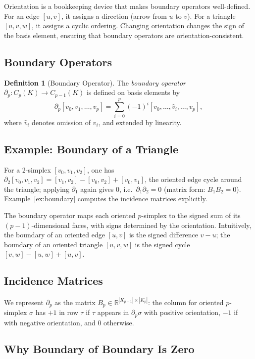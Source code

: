 \documentclass[11pt]{article}
\theoremstyle{definition}
\newtheorem{definition}[theorem]{Definition}
\theoremstyle{remark}
\newcommand{\R}{\mathbb{R}}
\begin{document}
Orientation is a bookkeeping device that makes boundary operators well-defined.
For an edge $[u,v]$, it assigns a direction (arrow from $u$ to $v$). For a
triangle $[u,v,w]$, it assigns a cyclic ordering. Changing orientation changes
the sign of the basis element, ensuring that boundary operators are
orientation-consistent.

\subsection{Boundary Operators}

\begin{definition}[Boundary Operator]
The \emph{boundary operator} $\partial_p\colon C_p(K)\to C_{p-1}(K)$ is
defined on basis elements by
\[
  \partial_p[v_0,v_1,\dots,v_p]
  = \sum_{i=0}^{p}(-1)^i[v_0,\dots,\hat{v}_i,\dots,v_p],
\]
where $\hat{v}_i$ denotes omission of $v_i$, and extended by linearity.
\end{definition}

\subsection{Example: Boundary of a Triangle}

For a 2-simplex $[v_0,v_1,v_2]$, one has
$\partial_2[v_0,v_1,v_2]=[v_1,v_2]-[v_0,v_2]+[v_0,v_1]$, the oriented edge cycle
around the triangle; applying $\partial_1$ again gives $0$, i.e.\ $\partial_1\partial_2=0$
(matrix form: $B_1B_2=0$). Example~\ref{ex:boundary} computes the incidence matrices
explicitly.

The boundary operator maps each oriented $p$-simplex to the signed sum of its
$(p-1)$-dimensional faces, with signs determined by the orientation. Intuitively,
the boundary of an oriented edge $[u,v]$ is the signed difference $v-u$; the
boundary of an oriented triangle $[u,v,w]$ is the signed cycle
$[v,w]-[u,w]+[u,v]$.

\subsection{Incidence Matrices}

We represent $\partial_p$ as the matrix $B_p \in \R^{|K_{p-1}|\times|K_p|}$:
the column for oriented $p$-simplex $\sigma$ has $+1$ in row $\tau$ if $\tau$
appears in $\partial_p\sigma$ with positive orientation, $-1$ if with negative
orientation, and $0$ otherwise.

\subsection{Why Boundary of Boundary Is Zero}
\end{document}
